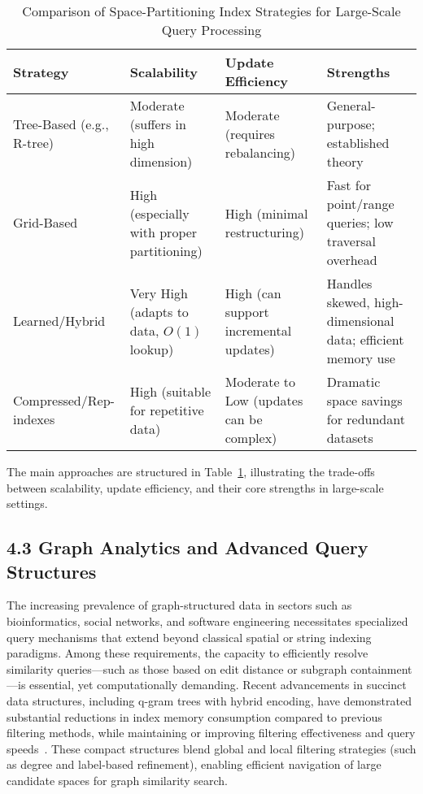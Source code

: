 \documentclass[11pt]{article}
\begin{document}
\begin{table}[ht]
\centering
\caption{Comparison of Space-Partitioning Index Strategies for Large-Scale Query Processing}
\label{tab:space_partition_comparison}
\begin{tabular}{|l|p{3.8cm}|p{3.8cm}|p{2.7cm}|}
\hline
\textbf{Strategy} & \textbf{Scalability} & \textbf{Update Efficiency} & \textbf{Strengths} \\
\hline
Tree-Based (e.g., R-tree) & Moderate (suffers in high dimension) & Moderate (requires rebalancing) & General-purpose; established theory \\
Grid-Based & High (especially with proper partitioning) & High (minimal restructuring) & Fast for point/range queries; low traversal overhead \\
Learned/Hybrid & Very High (adapts to data, $O(1)$ lookup) & High (can support incremental updates) & Handles skewed, high-dimensional data; efficient memory use \\
Compressed/Rep-indexes & High (suitable for repetitive data) & Moderate to Low (updates can be complex) & Dramatic space savings for redundant datasets \\
\hline
\end{tabular}
\end{table}

The main approaches are structured in Table~\ref{tab:space_partition_comparison}, illustrating the trade-offs between scalability, update efficiency, and their core strengths in large-scale settings.

\subsection{4.3 Graph Analytics and Advanced Query Structures}

The increasing prevalence of graph-structured data in sectors such as bioinformatics, social networks, and software engineering necessitates specialized query mechanisms that extend beyond classical spatial or string indexing paradigms. Among these requirements, the capacity to efficiently resolve similarity queries—such as those based on edit distance or subgraph containment—is essential, yet computationally demanding. Recent advancements in succinct data structures, including q-gram trees with hybrid encoding, have demonstrated substantial reductions in index memory consumption compared to previous filtering methods, while maintaining or improving filtering effectiveness and query speeds~\cite{ref106}. These compact structures blend global and local filtering strategies (such as degree and label-based refinement), enabling efficient navigation of large candidate spaces for graph similarity search.
\end{document}
